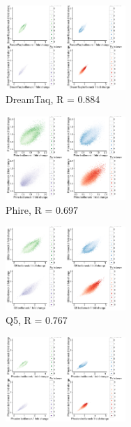 \documentclass[parskip=full, numbers=noenddot]{scrreprt}
\begin{document}
\begin{figure}[htb]
  \centering
  \begin{subfigure}[htb]{0.5\textwidth}
    \centering
    \includegraphics[width=0.5\textwidth]{kmer_dreamtaqBN}
    \caption{DreamTaq, R = 0.884}
    \label{fig:kmer_bn_dreamtaq}
  \end{subfigure}
  \begin{subfigure}[htb]{0.5\textwidth}
    \centering
    \includegraphics[width=0.5\textwidth]{kmer_phireBN}
    \caption{Phire, R = 0.697}
    \label{fig:kmer_bn_phire}
  \end{subfigure}
  \begin{subfigure}[htb]{0.5\textwidth}
    \centering
    \includegraphics[width=0.5\textwidth]{kmer_q5BN}
    \caption{Q5, R = 0.767}
    \label{fig:kmer_bn_q5}
  \end{subfigure}
  \begin{subfigure}[htb]{0.5\textwidth}
    \centering
    \includegraphics[width=0.5\textwidth]{kmer_phusionBN}

\end{subfigure}
\end{figure}
\end{document}
